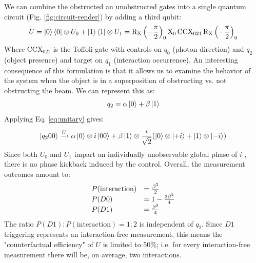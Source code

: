 \documentclass{article}
\newcommand{\X}{\text{X}}
\newcommand{\RX}{\mathrm{R_X}}
\newcommand{\CCX}{\text{CCX}}
\begin{document}
We can combine the obstructed an unobstructed gates into a single quantum circuit (Fig. \ref{fig:circuit-render}) by adding a third qubit:
\begin{equation} \label{eq:unitary}
U = \ket 0\bra 0 \otimes U_0 + \ket 1\bra 1 \otimes U_1 = \RX\left(-\frac{\pi}{2}\right)_0 \X_0 \, \CCX_{021} \, \RX\left(-\frac{\pi}{2}\right)_0
\end{equation}
Where $\CCX_{021}$ is the Toffoli gate with controls on $q_0$ (photon direction) and $q_2$ (object presence) and target on $q_1$ (interaction occurrence). An interesting consequence of this formulation is that it allows us to examine the behavior of the system when the object is in a superposition of obstructing vs. not obstructing the beam. We can represent this as:
$$q_2 = \alpha \ket 0 + \beta \ket 1$$
Applying Eq. \ref{eq:unitary} gives:
\begin{equation}
\ket{q_2 0 0} \xrightarrow{U} \alpha\ket 0 \otimes i\ket{00} + \beta \ket 1 \otimes \frac{i}{\sqrt{2}}(\ket0 \otimes \ket{+i} + \ket1 \otimes \ket{-i})
\end{equation}
Since both $U_0$ and $U_1$ impart an individually unobservable global phase of $i$ , there is no phase kickback induced by the control. Overall, the measurement outcomes amount to:
$$\begin{array}{ l l }
P(\text{interaction}) & = \frac{\beta^2}{2} \\
P(D0) & = 1 - \frac{3 \beta^2}{4} \\
P(D1) & = \frac{\beta^2}{4}
\end{array}$$
The ratio $P(D1) : P(\text{interaction}) = 1 : 2$ is independent of $q_2$. Since $D1$ triggering represents an interaction-free measurement, this means the "counterfactual efficiency" of $U$ is limited to 50\%; i.e. for every interaction-free measurement there will be, on average, two interactions.
\end{document}
